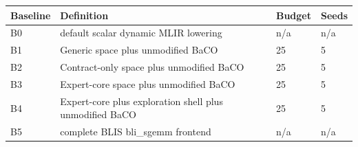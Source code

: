 \begin{tabular}{llll}
\toprule
Baseline & Definition & Budget & Seeds \\
\midrule
B0 & default scalar dynamic MLIR lowering & n/a & n/a \\
B1 & Generic space plus unmodified BaCO & 25 & 5 \\
B2 & Contract-only space plus unmodified BaCO & 25 & 5 \\
B3 & Expert-core space plus unmodified BaCO & 25 & 5 \\
B4 & Expert-core plus exploration shell plus unmodified BaCO & 25 & 5 \\
B5 & complete BLIS bli\_sgemm frontend & n/a & n/a \\
\bottomrule
\end{tabular}
